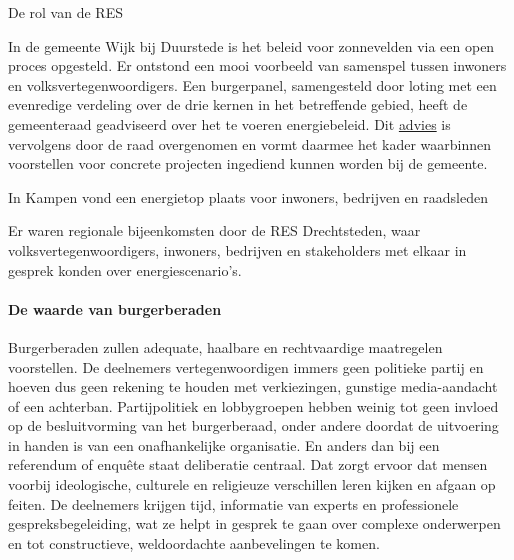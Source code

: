 \begin{voorstel}{De rol van de RES}
\begin{multicols*}{2}
\begin{overwegingen}
In de gemeente Wijk bij Duurstede is het beleid voor zonnevelden via een open proces opgesteld. Er ontstond een mooi voorbeeld van samenspel tussen inwoners en volksvertegenwoordigers. Een burgerpanel, samengesteld door loting met een evenredige verdeling over de drie kernen in het betreffende gebied, heeft de gemeenteraad geadviseerd over het te voeren energiebeleid. Dit \href{https://zonneveldenwijkbijduurstede.nl/wp-content/uploads/2019/11/20190613-Advies-Burgerpanel-zonnevelden.pdf}{advies} is vervolgens door de raad overgenomen en vormt daarmee het kader waarbinnen voorstellen voor concrete projecten ingediend kunnen worden bij de gemeente.

In Kampen vond een energietop plaats voor inwoners, bedrijven en raadsleden

Er waren regionale bijeenkomsten door de RES Drechtsteden, waar volksvertegenwoordigers, inwoners, bedrijven en stakeholders met elkaar in gesprek konden over energiescenario’s.


\paragraph{De waarde van burgerberaden}
Burgerberaden zullen adequate, haalbare en rechtvaardige maatregelen voorstellen. De deelnemers vertegenwoordigen immers geen politieke partij en hoeven dus geen rekening te houden met verkiezingen, gunstige media-aandacht of een achterban. Partijpolitiek en lobbygroepen hebben weinig tot geen invloed op de besluitvorming van het burgerberaad, onder andere doordat de uitvoering in handen is van een onafhankelijke organisatie. En anders dan bij een referendum of enquête staat deliberatie centraal. Dat zorgt ervoor dat mensen voorbij ideologische, culturele en religieuze verschillen leren kijken en afgaan op feiten. De deelnemers krijgen tijd, informatie van experts en professionele gespreksbegeleiding, wat ze helpt in gesprek te gaan over complexe onderwerpen en tot constructieve, weldoordachte aanbevelingen te komen.


\end{overwegingen}
\end{multicols*}
\end{voorstel}
